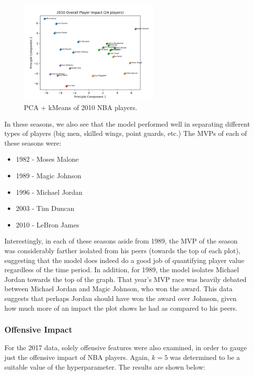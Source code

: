 \documentclass{article}
\begin{document}
\begin{figure}[h]
  \centering
  \includegraphics[width=7cm]{2010_Graphs/PCA_Overall_2010.png}
  \caption{PCA + kMeans of 2010 NBA players.}
\end{figure}

\newpage In these seasons, we also see that the model performed well in separating different types of players (big men, skilled wings, point guards, etc.) The MVPs of each of these seasons were: 

\begin{itemize}
  \item 1982 - Moses Malone
  \item 1989 - Magic Johnson
  \item 1996 - Michael Jordan
  \item 2003 - Tim Duncan
  \item 2010 - LeBron James
\end{itemize}

Interestingly, in each of these seasons aside from 1989, the MVP of the season was considerably farther isolated from his peers (towards the top of each plot), suggesting that the model does indeed do a good job of quantifying player value regardless of the time period. In addition, for 1989, the model isolates Michael Jordan towards the top of the graph. That year's MVP race was heavily debated between Michael Jordan and Magic Johnson, who won the award. This data suggests that perhaps Jordan should have won the award over Johnson, given how much more of an impact the plot shows he had as compared to his peers.

\subsubsection{Offensive Impact}

For the 2017 data, solely offensive features were also examined, in order to gauge just the offensive impact of NBA players. Again, $k=5$ was determined to be a suitable value of the hyperparameter. The results are shown below:
\end{document}
